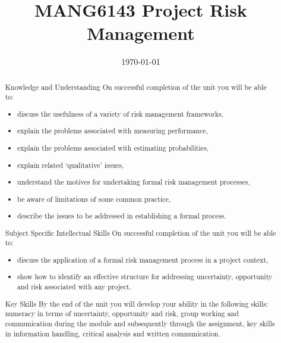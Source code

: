 \documentclass{ecsarticle}     %
\begin{document}
\frontmatter
\title      {MANG6143 Project Risk Management}
\purpose  {}
\addresses  {\purname\\\coname\\\univname}
\date       {\today}
\subject    {Performance Uncertainty Management Processes - Overview and Appraisal}
\keywords   {}
\maketitle
\begin{abstract}
Knowledge and Understanding
On successful completion of the unit you will be able to:
\begin{itemize}
\item discuss the usefulness of a variety of risk management frameworks,
\item explain the problems associated with measuring performance,
\item explain the problems associated with estimating probabilities,
\item explain related ‘qualitative’ issues,
\item understand the motives for undertaking formal risk management processes,
\item be aware of limitations of some common practice,
\item describe the issues to be addressed in establishing a formal process.
\end{itemize}
Subject Specific Intellectual Skills
On successful completion of the unit you will be able to:
\begin{itemize}
\item discuss the application of a formal risk management process in a project context,  
\item show how to identify an effective structure for addressing uncertainty, opportunity and risk associated with any project.
\end{itemize}

Key Skills
By the end of the unit you will develop your ability in the following skills: 
numeracy in terms of uncertainty, opportunity and risk, group working and communication during the module and subsequently through the assignment, key skills in information handling, critical analysis and written communication.

\end{abstract}



\mainmatter




\backmatter




\appendix
\end{document}
